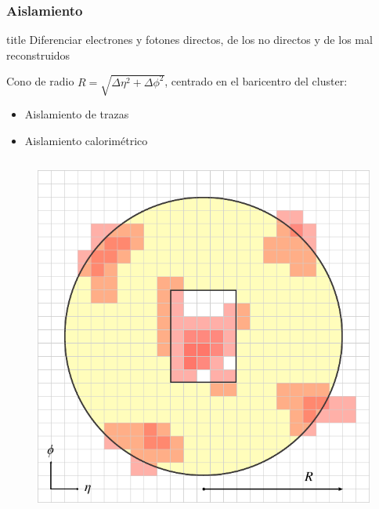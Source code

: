 \documentclass[10pt, compress,spanish]{beamer}
\begin{document}

\begin{frame}[fragile]

\frametitle{Aislamiento}

\normalsize

\begin{beamercolorbox}[leftskip=\titlelf]{title}
\normalsize Diferenciar electrones y fotones directos, de los no directos y de los mal reconstruidos
\end{beamercolorbox}

Cono de radio $R=\sqrt{\Delta\eta^{2}+\Delta\phi^{2}}$, centrado en el baricentro del cluster:

\begin{itemize}

\item Aislamiento de trazas

\item Aislamiento calorimétrico

\end{itemize}


\begin{columns}

\begin{column}{0.5\textwidth}
\begin{figure}
\includegraphics[scale=0.3]{iso.pdf}
\end{figure}
\end{column}



\end{columns}
\end{frame}
\end{document}
